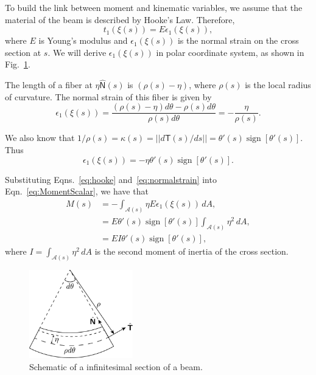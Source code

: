 \documentclass{article}
\newcommand{\bsf}[1]{\boldsymbol{\mathsf{#1}}}
\DeclareMathOperator{\sign}{sign}
\begin{document}
To build the link between moment and kinematic variables, we assume that the material of the beam is described by Hooke's Law. Therefore, 
\begin{equation}
\label{eq:hooke}
 t_1(\bsf{\xi}(s)) = E \epsilon_1(\bsf{\xi}(s)),
 \end{equation} 
 where $E$ is Young's modulus and $\epsilon_1(\bsf{\xi}(s)) $ is the normal strain on the cross section at $s$. We will derive $\epsilon_1(\bsf{\xi}(s)) $ in polar coordinate system, as shown in Fig.~\ref{fig:polar}.

The length of a fiber at $\eta  \hat{\bsf{N}}(s)$ is $(\rho(s)-\eta)$, where $\rho(s)$ is the local radius of curvature. The normal strain of this fiber is given by
\begin{equation}
\epsilon_1(\bsf{\xi}(s)) = \frac{(\rho(s)-\eta)d\theta  - \rho(s) d\theta}{\rho(s)d\theta} = -\frac{\eta}{\rho(s)}.
\end{equation}

We also know that $1/\rho(s)  = \kappa(s) = \left|\left|d \bsf{T}(s)/d s\right|\right|= \theta'(s) \sign\left[\theta'(s)\right]$. Thus
\begin{equation}
\label{eq:normalstrain}
\epsilon_1(\bsf{\xi}(s)) = -\eta \theta'(s) \sign\left[\theta'(s)\right].
\end{equation}

Substituting Eqns.~\eqref{eq:hooke} and~\eqref{eq:normalstrain} into Eqn.~\eqref{eq:MomentScalar}, we have that 
\begin{align}
M(s) &=  -\int_{\mathcal{A}(s)}  \eta E \epsilon_1(\bsf{\xi}(s))\, dA , \\
&=  E \theta'(s) \sign\left[\theta'(s)\right] \int_{\mathcal{A}(s)}  \eta^2  \, dA , \\
&=  E I \theta'(s) \sign\left[\theta'(s)\right] ,
\label{eq:MomentFinal}
\end{align}
where $I =  \int_{\mathcal{A}(s)}  \eta^2  \, dA $ is the second moment of inertia of the cross section.


\begin{figure}[H]
\centering 
\includegraphics[width=0.4\textwidth]{Figures/sector.pdf}
\caption{Schematic of a infinitesimal section of a beam.}
\label{fig:polar}
\end{figure}
\end{document}
